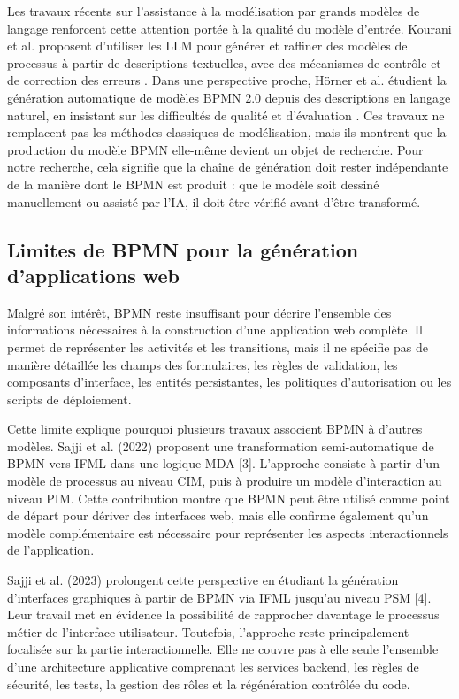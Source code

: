 Les travaux récents sur l'assistance à la modélisation par grands modèles de langage renforcent cette attention portée à la qualité du modèle d'entrée. Kourani et al. proposent d'utiliser les LLM pour générer et raffiner des modèles de processus à partir de descriptions textuelles, avec des mécanismes de contrôle et de correction des erreurs \cite{kourani2024}. Dans une perspective proche, Hörner et al. étudient la génération automatique de modèles BPMN 2.0 depuis des descriptions en langage naturel, en insistant sur les difficultés de qualité et d'évaluation \cite{horner2026}. Ces travaux ne remplacent pas les méthodes classiques de modélisation, mais ils montrent que la production du modèle BPMN elle-même devient un objet de recherche. Pour notre recherche, cela signifie que la chaîne de génération doit rester indépendante de la manière dont le BPMN est produit : que le modèle soit dessiné manuellement ou assisté par l'IA, il doit être vérifié avant d'être transformé.

\subsection{Limites de BPMN pour la génération d'applications web}

Malgré son intérêt, BPMN reste insuffisant pour décrire l'ensemble des informations nécessaires à la construction d'une application web complète. Il permet de représenter les activités et les transitions, mais il ne spécifie pas de manière détaillée les champs des formulaires, les règles de validation, les composants d'interface, les entités persistantes, les politiques d'autorisation ou les scripts de déploiement.

Cette limite explique pourquoi plusieurs travaux associent BPMN à d'autres modèles. Sajji et al. (2022) proposent une transformation semi-automatique de BPMN vers IFML dans une logique MDA [3]. L'approche consiste à partir d'un modèle de processus au niveau CIM, puis à produire un modèle d'interaction au niveau PIM. Cette contribution montre que BPMN peut être utilisé comme point de départ pour dériver des interfaces web, mais elle confirme également qu'un modèle complémentaire est nécessaire pour représenter les aspects interactionnels de l'application.

Sajji et al. (2023) prolongent cette perspective en étudiant la génération d'interfaces graphiques à partir de BPMN via IFML jusqu'au niveau PSM [4]. Leur travail met en évidence la possibilité de rapprocher davantage le processus métier de l'interface utilisateur. Toutefois, l'approche reste principalement focalisée sur la partie interactionnelle. Elle ne couvre pas à elle seule l'ensemble d'une architecture applicative comprenant les services backend, les règles de sécurité, les tests, la gestion des rôles et la régénération contrôlée du code.

